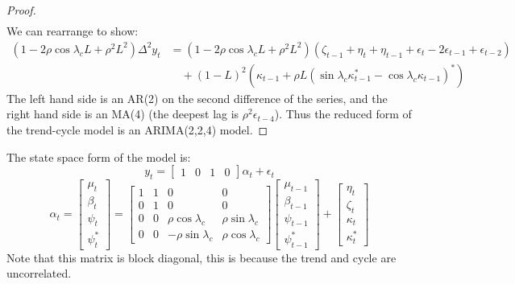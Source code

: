 \documentclass[DIV=14,titlepage=false]{scrreprt}
\begin{document}
\begin{proof}
\begin{align*}
    \end{align*}
    We can rearrange to show:
    \begin{align*}
        (1-2\rho \cos \lambda_c L + \rho^2L^2)\Delta^2 y_t &= (1-2\rho \cos \lambda_c L + \rho^2L^2)(\zeta_{t-1} + \eta_t + \eta_{t-1} + \epsilon_t - 2\epsilon_{t-1} + \epsilon_{t-2}) \\
        & \quad + (1-L)^2(\kappa_{t-1} +\rho L (\sin \lambda_c \kappa_{t-1}^* - \cos \lambda_c \kappa_{t-1})^*)
    \end{align*}
    The left hand side is an AR(2) on the second difference of the series, and the right hand side is an MA(4) (the deepest lag is $\rho^2 \epsilon_{t-4}$). Thus the reduced form of the trend-cycle model is an ARIMA(2,2,4) model.
\end{proof}
The state space form of the model is:
\[
    y_t = \begin{bmatrix} 1 & 0 & 1 & 0 \end{bmatrix} \alpha_t + \epsilon_t
    \]
\[
    \alpha_t = \begin{bmatrix} \mu_t \\ \beta_t \\ \psi_t \\ \psi_t^* \end{bmatrix} = \begin{bmatrix} 1 & 1 & 0 & 0 \\ 0 & 1 & 0 & 0 \\ 0 & 0 & \rho \cos \lambda_c & \rho \sin \lambda_c \\ 0 & 0 & -\rho \sin \lambda_c & \rho \cos \lambda_c \end{bmatrix} \begin{bmatrix} \mu_{t-1} \\ \beta_{t-1} \\ \psi_{t-1} \\ \psi_{t-1}^* \end{bmatrix} + \begin{bmatrix} \eta_t \\ \zeta_t \\ \kappa_t \\ \kappa_t^* \end{bmatrix}
\]
Note that this matrix is block diagonal, this is because the trend and cycle are uncorrelated.
\end{document}
